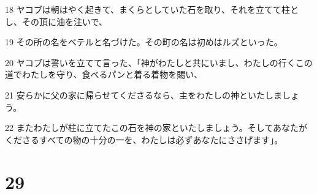 \par 18 ヤコブは朝はやく起きて、まくらとしていた石を取り、それを立てて柱とし、その頂に油を注いで、
\par 19 その所の名をベテルと名づけた。その町の名は初めはルズといった。
\par 20 ヤコブは誓いを立てて言った、「神がわたしと共にいまし、わたしの行くこの道でわたしを守り、食べるパンと着る着物を賜い、
\par 21 安らかに父の家に帰らせてくださるなら、主をわたしの神といたしましょう。
\par 22 またわたしが柱に立てたこの石を神の家といたしましょう。そしてあなたがくださるすべての物の十分の一を、わたしは必ずあなたにささげます」。

\chapter{29}

